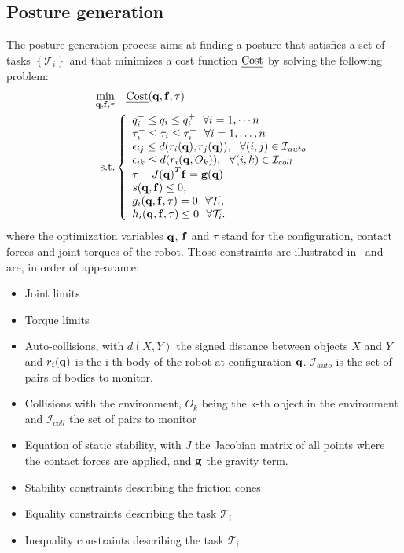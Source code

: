 \subsection{Posture generation}
\label{subsec:pg}

The posture generation process aims at finding a posture that satisfies a set of tasks $\left\{ \mathcal{T}_i \right\}$ and that minimizes a cost function $\mbox{\emph{Cost}}$ by solving the following problem:
\begin{align}
\min_{\bf q, \bf f, \tau} & \quad \mbox{\emph{Cost}}({\bf q,f,\tau}) \nonumber\\
\text{s.t.}&
\left\{
\begin{array}{lr}
q_i^- \le q_i \le q_i^+\ \ \forall i=1,\cdots n \\
\tau_i^- \le \tau_i \le \tau_i^+\ \ \forall i=1,\ldots,n \\
\epsilon_{ij} \le d(r_i({\bf q}), r_j({\bf q})),\ \ \forall(i,j)\in\mathcal{I}_{auto} \\
\epsilon_{ik} \le d(r_i({\bf q}, O_k)),\ \ \forall(i,k)\in\mathcal{I}_{coll}\\
\tau + {J({\bf q})}^T{\bf f} = {\bf g(q)}\\
s({\bf q,f})\le 0,\\
g_i({\bf q,f,\tau}) = 0\ \ \forall\mathcal{T}_i,\\
h_i({\bf q,f,\tau}) \le 0\ \ \forall\mathcal{T}_i.
\end{array}\right.
\label{eq:PG_chap2}
\end{align}
where the optimization variables $\bf q$, $\bf f$ and $\tau$ stand for the configuration, contact forces and joint torques of the robot.
Those constraints are illustrated in~ and are, in order of appearance:
\begin{itemize}
\item Joint limits
\item Torque limits
\item Auto-collisions, with $d(X,Y)$ the signed distance between objects $X$ and $Y$ and $r_i(\bf q)$ is the i-th body of the robot at configuration $\bf q$. $\mathcal{I}_{auto}$ is the set of pairs of bodies to monitor.
\item Collisions with the environment, $O_k$ being the k-th object in the environment and $\mathcal{I}_{coll}$ the set of pairs to monitor
\item Equation of static stability, with $J$ the Jacobian matrix of all points where the contact forces are applied, and $\bf g$ the gravity term.
\item Stability constraints describing the friction cones
\item Equality constraints describing the task $\mathcal{T}_i$
\item Inequality constraints describing the task $\mathcal{T}_i$
\end{itemize}

